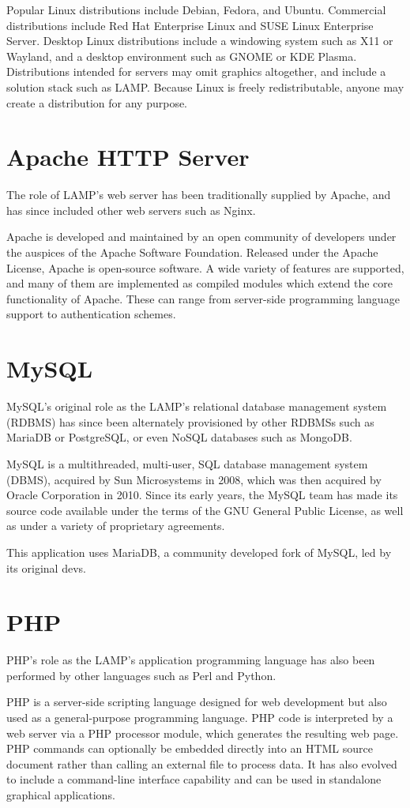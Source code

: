 \documentclass[10pt,a4paper,titlepage]{report}
\begin{document}
\par Popular Linux distributions include Debian, Fedora, and Ubuntu. Commercial distributions include Red Hat Enterprise Linux and SUSE Linux Enterprise Server. Desktop Linux distributions include a windowing system such as X11 or Wayland, and a desktop environment such as GNOME or KDE Plasma. Distributions intended for servers may omit graphics altogether, and include a solution stack such as LAMP. Because Linux is freely redistributable, anyone may create a distribution for any purpose. 

\section{Apache HTTP Server}
The role of LAMP's web server has been traditionally supplied by Apache, and has since included other web servers such as Nginx.
\par Apache is developed and maintained by an open community of developers under the auspices of the Apache Software Foundation. Released under the Apache License, Apache is open-source software. A wide variety of features are supported, and many of them are implemented as compiled modules which extend the core functionality of Apache. These can range from server-side programming language support to authentication schemes. 
\section{MySQL}
MySQL's original role as the LAMP's relational database management system (RDBMS) has since been alternately provisioned by other RDBMSs such as MariaDB or PostgreSQL, or even NoSQL databases such as MongoDB.
\par MySQL is a multithreaded, multi-user, SQL database management system (DBMS), acquired by Sun Microsystems in 2008, which was then acquired by Oracle Corporation in 2010. Since its early years, the MySQL team has made its source code available under the terms of the GNU General Public License, as well as under a variety of proprietary agreements. 
\par This application uses MariaDB, a community developed fork of MySQL, led by its original devs.
\section{PHP}
PHP's role as the LAMP's application programming language has also been performed by other languages such as Perl and Python. 
\par PHP is a server-side scripting language designed for web development but also used as a general-purpose programming language. PHP code is interpreted by a web server via a PHP processor module, which generates the resulting web page. PHP commands can optionally be embedded directly into an HTML source document rather than calling an external file to process data. It has also evolved to include a command-line interface capability and can be used in standalone graphical applications.
\end{document}
